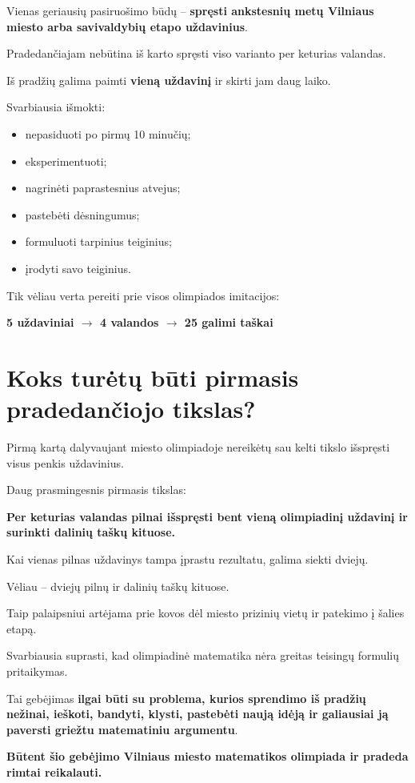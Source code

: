 \documentclass[11pt,a4paper]{article}
\newcommand{\calloutbox}[1]{%
  \begin{center}
  \colorbox{callout}{%
    \parbox{0.94\textwidth}{\centering\bfseries #1}%
  }
  \end{center}
}
\begin{document}
Vienas geriausių pasiruošimo būdų -- \textbf{spręsti ankstesnių metų Vilniaus miesto arba savivaldybių etapo uždavinius}.

Pradedančiajam nebūtina iš karto spręsti viso varianto per keturias valandas.

Iš pradžių galima paimti \textbf{vieną uždavinį} ir skirti jam daug laiko.

Svarbiausia išmokti:
\begin{itemize}
  \item nepasiduoti po pirmų 10 minučių;
  \item eksperimentuoti;
  \item nagrinėti paprastesnius atvejus;
  \item pastebėti dėsningumus;
  \item formuluoti tarpinius teiginius;
  \item įrodyti savo teiginius.
\end{itemize}

Tik vėliau verta pereiti prie visos olimpiados imitacijos:

\calloutbox{5 uždaviniai $\rightarrow$ 4 valandos $\rightarrow$ 25 galimi taškai}

\section{Koks turėtų būti pirmasis pradedančiojo tikslas?}

Pirmą kartą dalyvaujant miesto olimpiadoje nereikėtų sau kelti tikslo išspręsti visus penkis uždavinius.

Daug prasmingesnis pirmasis tikslas:

\calloutbox{Per keturias valandas pilnai išspręsti bent vieną olimpiadinį uždavinį ir surinkti dalinių taškų kituose.}

Kai vienas pilnas uždavinys tampa įprastu rezultatu, galima siekti dviejų.

Vėliau -- dviejų pilnų ir dalinių taškų kituose.

Taip palaipsniui artėjama prie kovos dėl miesto prizinių vietų ir patekimo į šalies etapą.

Svarbiausia suprasti, kad olimpiadinė matematika nėra greitas teisingų formulių pritaikymas.

Tai gebėjimas \textbf{ilgai būti su problema, kurios sprendimo iš pradžių nežinai, ieškoti, bandyti, klysti, pastebėti naują idėją ir galiausiai ją paversti griežtu matematiniu argumentu}.

\enlargethispage{3\baselineskip}
\begin{center}
\textbf{Būtent šio gebėjimo Vilniaus miesto matematikos olimpiada ir pradeda rimtai reikalauti.}
\end{center}

\thispagestyle{empty}
\end{document}
